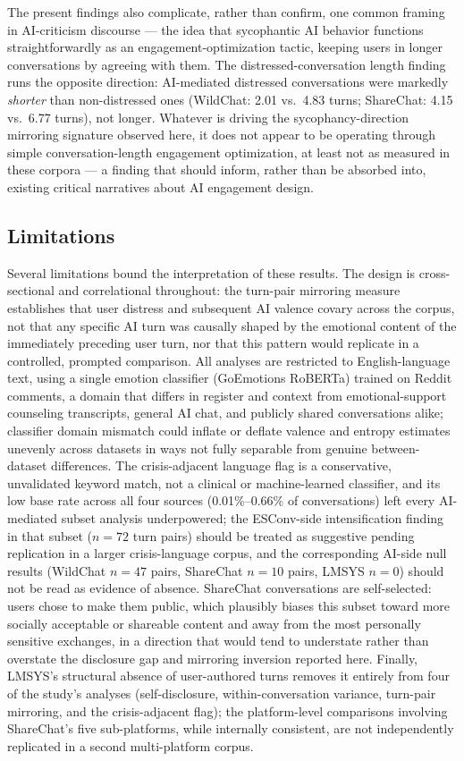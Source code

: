 \documentclass[11pt]{article}
\begin{document}
The present findings also complicate, rather than confirm, one common framing in AI-criticism discourse --- the idea that sycophantic AI behavior functions straightforwardly as an engagement-optimization tactic, keeping users in longer conversations by agreeing with them. The distressed-conversation length finding runs the opposite direction: AI-mediated distressed conversations were markedly \emph{shorter} than non-distressed ones (WildChat: 2.01 vs.\ 4.83 turns; ShareChat: 4.15 vs.\ 6.77 turns), not longer. Whatever is driving the sycophancy-direction mirroring signature observed here, it does not appear to be operating through simple conversation-length engagement optimization, at least not as measured in these corpora --- a finding that should inform, rather than be absorbed into, existing critical narratives about AI engagement design.

\subsection{Limitations}

Several limitations bound the interpretation of these results. The design is cross-sectional and correlational throughout: the turn-pair mirroring measure establishes that user distress and subsequent AI valence covary across the corpus, not that any specific AI turn was causally shaped by the emotional content of the immediately preceding user turn, nor that this pattern would replicate in a controlled, prompted comparison. All analyses are restricted to English-language text, using a single emotion classifier (GoEmotions RoBERTa) trained on Reddit comments, a domain that differs in register and context from emotional-support counseling transcripts, general AI chat, and publicly shared conversations alike; classifier domain mismatch could inflate or deflate valence and entropy estimates unevenly across datasets in ways not fully separable from genuine between-dataset differences. The crisis-adjacent language flag is a conservative, unvalidated keyword match, not a clinical or machine-learned classifier, and its low base rate across all four sources (0.01\%--0.66\% of conversations) left every AI-mediated subset analysis underpowered; the ESConv-side intensification finding in that subset ($n = 72$ turn pairs) should be treated as suggestive pending replication in a larger crisis-language corpus, and the corresponding AI-side null results (WildChat $n = 47$ pairs, ShareChat $n = 10$ pairs, LMSYS $n = 0$) should not be read as evidence of absence. ShareChat conversations are self-selected: users chose to make them public, which plausibly biases this subset toward more socially acceptable or shareable content and away from the most personally sensitive exchanges, in a direction that would tend to understate rather than overstate the disclosure gap and mirroring inversion reported here. Finally, LMSYS's structural absence of user-authored turns removes it entirely from four of the study's analyses (self-disclosure, within-conversation variance, turn-pair mirroring, and the crisis-adjacent flag); the platform-level comparisons involving ShareChat's five sub-platforms, while internally consistent, are not independently replicated in a second multi-platform corpus.
\end{document}

